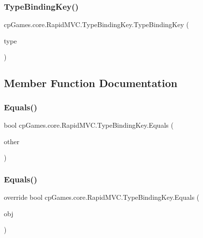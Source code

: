 \subsubsection{\texorpdfstring{TypeBindingKey()}{TypeBindingKey()}}
{\footnotesize\ttfamily cp\+Games.\+core.\+Rapid\+M\+V\+C.\+Type\+Binding\+Key.\+Type\+Binding\+Key (\begin{DoxyParamCaption}\item[{\mbox{\hyperlink{classcp_games_1_1core_1_1_rapid_m_v_c_1_1_type_binding_key_a2607ca6b5f825138867c84fb68fb159e}{Type}}}]{type }\end{DoxyParamCaption})}



\subsection{Member Function Documentation}
\mbox{\label{classcp_games_1_1core_1_1_rapid_m_v_c_1_1_type_binding_key_abaa2ed80522ff281223cb0e676cffd09}} 
\subsubsection{\texorpdfstring{Equals()}{Equals()}\hspace{0.1cm}{\footnotesize\ttfamily [1/2]}}
{\footnotesize\ttfamily bool cp\+Games.\+core.\+Rapid\+M\+V\+C.\+Type\+Binding\+Key.\+Equals (\begin{DoxyParamCaption}\item[{\mbox{\hyperlink{classcp_games_1_1core_1_1_rapid_m_v_c_1_1_type_binding_key}{Type\+Binding\+Key}}}]{other }\end{DoxyParamCaption})\hspace{0.3cm}{\ttfamily [protected]}}

\mbox{\label{classcp_games_1_1core_1_1_rapid_m_v_c_1_1_type_binding_key_a72bf6dd640ba88180b92a4533b9417eb}} 
\subsubsection{\texorpdfstring{Equals()}{Equals()}\hspace{0.1cm}{\footnotesize\ttfamily [2/2]}}
{\footnotesize\ttfamily override bool cp\+Games.\+core.\+Rapid\+M\+V\+C.\+Type\+Binding\+Key.\+Equals (\begin{DoxyParamCaption}\item[{object}]{obj }\end{DoxyParamCaption})}

